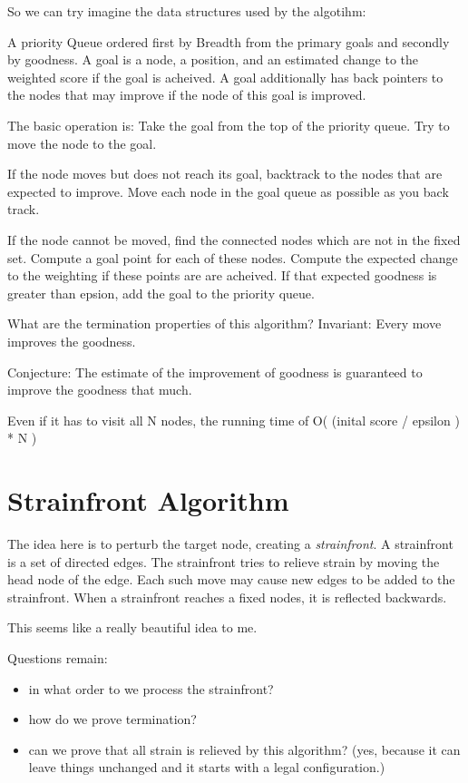 \documentclass[11pt]{article}
\begin{document}
So we can try imagine the data structures used by the algotihm:

A priority Queue ordered first by Breadth from the primary goals and secondly by goodness.
A goal is a node, a position, and an estimated change to the weighted score
if the goal is acheived.
A goal additionally has back pointers to the nodes that may improve
if the node of this goal is improved.

The basic operation is:
Take the goal from the top of the priority queue.
Try to move the node to the goal.

If the node moves but does not reach its goal, backtrack to the nodes that are expected
to improve. Move each node in the goal queue as possible as you back track.

If the node cannot be moved, find the connected nodes
which are not in the fixed set. Compute a goal point for each of these nodes. Compute the
expected change to the weighting if these points are are acheived. If that expected
goodness is greater than epsion, add the goal to the
priority queue.

What are the termination properties of this algorithm?
Invariant: Every move improves the goodness.

Conjecture: The estimate of the improvement of goodness is guaranteed to improve the
goodness that much.

Even if it has to visit all N nodes, the running time of O( (inital score / epsilon ) * N )

\section{Strainfront Algorithm}

The idea here is to perturb the target node, creating a \emph{strainfront}. A strainfront is a
set of directed edges. The strainfront tries to relieve strain by moving the head node of the
edge. Each such move may cause new edges to be added to the strainfront. When a strainfront
reaches a fixed nodes, it is reflected backwards.

This seems like a really beautiful idea to me.

Questions remain:
\begin{itemize}
\item in what order to we process the strainfront?
\item how do we prove termination?
\item can we prove that all strain is relieved by this algorithm? (yes, because
  it can leave things unchanged and it starts with a legal configuration.)
\end{itemize}
\end{document}
